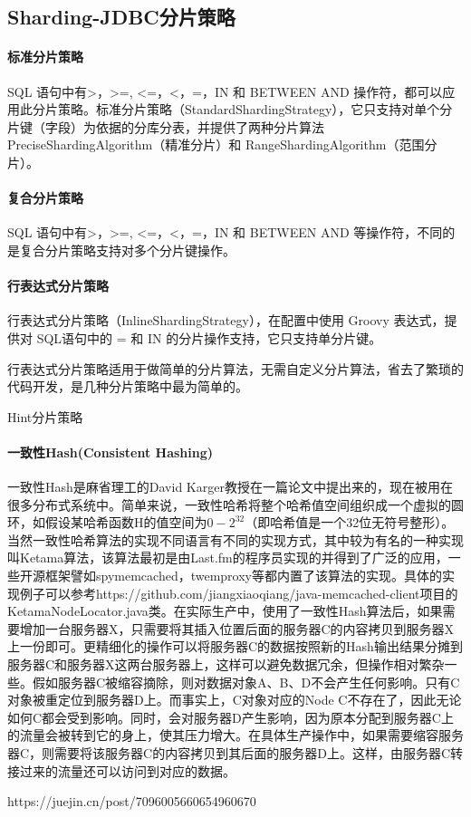 \documentclass[../../../interview-questions.tex]{subfiles}
\begin{document}
\subsection{Sharding-JDBC分片策略}

\paragraph{标准分片策略}

SQL 语句中有>，>=, <=，<，=，IN 和 BETWEEN AND 操作符，都可以应用此分片策略。标准分片策略（StandardShardingStrategy），它只支持对单个分片键（字段）为依据的分库分表，并提供了两种分片算法 PreciseShardingAlgorithm（精准分片）和 RangeShardingAlgorithm（范围分片）。

\paragraph{复合分片策略}

SQL 语句中有>，>=, <=，<，=，IN 和 BETWEEN AND 等操作符，不同的是复合分片策略支持对多个分片键操作。

\paragraph{行表达式分片策略}

行表达式分片策略（InlineShardingStrategy），在配置中使用 Groovy 表达式，提供对 SQL语句中的 = 和 IN 的分片操作支持，它只支持单分片键。

行表达式分片策略适用于做简单的分片算法，无需自定义分片算法，省去了繁琐的代码开发，是几种分片策略中最为简单的。


Hint分片策略

\paragraph{一致性Hash(Consistent Hashing)}

一致性Hash是麻省理工的David Karger教授在一篇论文中提出来的，现在被用在很多分布式系统中。简单来说，一致性哈希将整个哈希值空间组织成一个虚拟的圆环，如假设某哈希函数H的值空间为$0-2^{32}$（即哈希值是一个32位无符号整形）。当然一致性哈希算法的实现不同语言有不同的实现方式，其中较为有名的一种实现叫Ketama算法，该算法最初是由Last.fm的程序员实现的并得到了广泛的应用，一些开源框架譬如spymemcached，twemproxy等都内置了该算法的实现。具体的实现例子可以参考https://github.com/jiangxiaoqiang/java-memcached-client项目的KetamaNodeLocator.java类。在实际生产中，使用了一致性Hash算法后，如果需要增加一台服务器X，只需要将其插入位置后面的服务器C的内容拷贝到服务器X上一份即可。更精细化的操作可以将服务器C的数据按照新的Hash输出结果分摊到服务器C和服务器X这两台服务器上，这样可以避免数据冗余，但操作相对繁杂一些。假如服务器C被缩容摘除，则对数据对象A、B、D不会产生任何影响。只有C对象被重定位到服务器D上。而事实上，C对象对应的Node C不存在了，因此无论如何C都会受到影响。同时，会对服务器D产生影响，因为原本分配到服务器C上的流量会被转到它的身上，使其压力增大。在具体生产操作中，如果需要缩容服务器C，则需要将该服务器C的内容拷贝到其后面的服务器D上。这样，由服务器C转接过来的流量还可以访问到对应的数据。

https://juejin.cn/post/7096005660654960670
\end{document}
